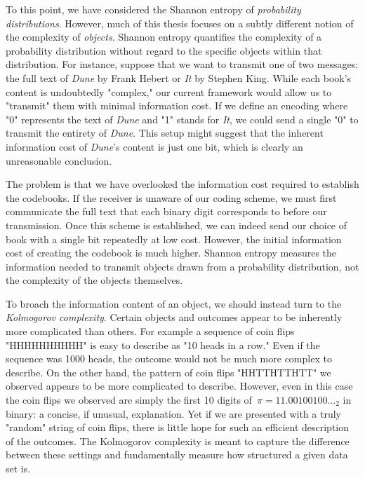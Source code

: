 To this point, we have considered the Shannon entropy of \emph{probability distributions}. However, much of this thesis focuses on a subtly different notion of the complexity of \emph{objects}. Shannon entropy quantifies the complexity of a probability distribution without regard to the specific objects within that distribution. For instance, suppose that we want to transmit one of two messages: the full text of \textit{Dune} by Frank Hebert or \textit{It} by Stephen King. While each book's content is undoubtedly "complex," our current framework would allow us to "transmit" them with minimal information cost. If we define an encoding where "0" represents the text of \textit{Dune} and "1" stands for \textit{It}, we could send a single "0" to transmit the entirety of \textit{Dune}. This setup might suggest that the inherent information cost of \textit{Dune}'s content is just one bit, which is clearly an unreasonable conclusion.

The problem is that we have overlooked the information cost required to establish the codebooks. If the receiver is unaware of our coding scheme, we must first communicate the full text that each binary digit corresponds to before our transmission. Once this scheme is established, we can indeed send our choice of book with a single bit repeatedly at low cost. However, the initial information cost of creating the codebook is much higher. Shannon entropy measures the information needed to transmit objects drawn from a probability distribution, not the complexity of the objects themselves.

To broach the information content of an object, we should instead turn to the \emph{Kolmogorov complexity}. Certain objects and outcomes appear to be inherently more complicated than others. For example a sequence of coin flips "HHHHHHHHHH" is easy to describe as "10 heads in a row." Even if the sequence was 1000 heads, the outcome would not be much more complex to describe. On the other hand, the pattern of coin flips "HHTTHTTHTT" we observed appears to be more complicated to describe. However, even in this case the coin flips we observed are simply the first 10 digits of~$\pi = 11.00100100..._2$ in binary: a concise, if unusual, explanation. Yet if we are presented with a truly "random" string of coin flips, there is little hope for such an efficient description of the outcomes. The Kolmogorov complexity is meant to capture the difference between these settings and fundamentally measure how structured a given data set is. 

